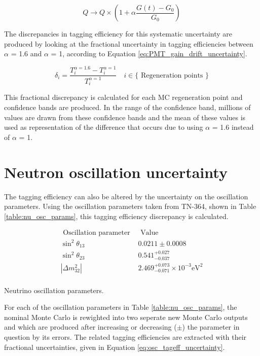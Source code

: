 \begin{equation}
    Q \longrightarrow Q \times\left(1+\alpha\frac{G(t)-G_0}{G_0}\right)
\label{eq:PMT_drift_gain_scaling}
\end{equation}

The discrepancies in tagging efficiency for this systematic uncertainty are produced by looking at the fractional uncertainty in tagging efficiencies between $\alpha$ = 1.6 and $\alpha$ = 1, according to Equation \ref{eq:PMT_gain_drift_uncertainty}.

\begin{equation}
    \delta_i=\frac{T_i^{\alpha=1.6}-T_i^{\alpha=1}}{T_i^{\alpha=1}} \quad i \in\{\text { Regeneration points }\}
\label{eq:PMT_gain_drift_uncertainty}
\end{equation}

This fractional discrepancy is calculated for each MC regeneration point and confidence bands are produced. In the range of the confidence band, millions of values are drawn from these confidence bands and the mean of these values is used as representation of the difference that occurs due to using $\alpha$ = 1.6 instead of $\alpha$ = 1. 

\section{Neutron oscillation uncertainty}

The tagging efficiency can also be altered by the uncertainty on the oscillation parameters. Using the oscillation parameters taken from TN-364, shown in Table \ref{table:nu_osc_params}, this tagging efficiency discrepancy is calculated. 

\begin{table}
    $$
    \begin{array}{llc}
         \text { Oscillation parameter } & \text { Value } \\
        \sin ^2 \theta_{13} & 0.0211 \pm 0.0008 \\
        \sin ^2 \theta_{23} & 0.541_{-0.037}^{+0.027} \\
        \left|\Delta m_{32}^2\right| & 2.469_{-0.071}^{+0.073} \times 10^{-3} \mathrm{eV}^2 \\
    \end{array}
    $$
\caption{Neutrino oscillation parameters.} 
\label{table:nu_osc_params}
\end{table}


For each of the oscillation parameters in Table \ref{table:nu_osc_params}, the nominal Monte Carlo is rewighted into two seperate new Monte Carlo outputs and which are produced after increasing or decreasing ($\pm$) the parameter in question by its errors. The related tagging efficiencies are extracted with their fractional uncertainties, given in Equation \ref{eq:osc_tageff_uncertainty}.   

